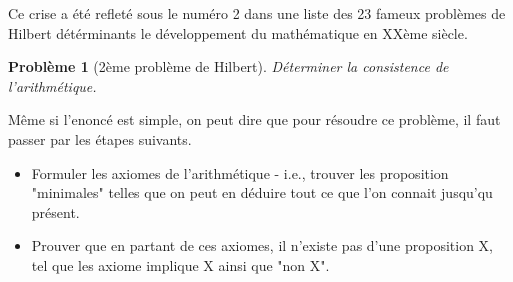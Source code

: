 \documentclass[12pt, a4paper]{article}
\newtheorem*{problem}{Problème}
\begin{document}
Ce crise a été refleté sous le numéro 2 dans une liste des 23 fameux problèmes de Hilbert détérminants le développement du mathématique en XXème siècle. 
\begin{problem}[2ème problème de Hilbert]
	Déterminer la consistence de l'arithmétique.
\end{problem}
Même si l'enoncé est simple, on peut dire que pour résoudre ce problème, il faut passer par les étapes suivants.
\begin{itemize}
	\item Formuler les axiomes de l'arithmétique - i.e., trouver les proposition "minimales" telles que on peut en déduire tout ce que l'on connait jusqu'qu présent.
	\item Prouver que en partant de ces axiomes, il n'existe pas d'une proposition X, tel que les axiome implique X ainsi que "non X".
\end{itemize}


%
\end{document}
